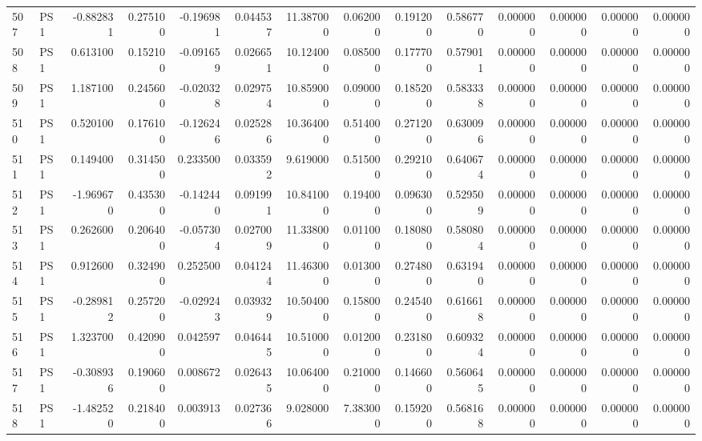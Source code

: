 \begin{tabular}{llrrrrrrrrrrrr}
507 &    PS1 & -0.882831 &      0.275100 & -0.196981 &    0.044537 &  11.387000 &      0.062000 &   0.191200 &  0.586770 &  0.000000 &   0.000000 &     0.000000 &     0.000000 \\
508 &    PS1 &  0.613100 &      0.152100 & -0.091659 &    0.026651 &  10.124000 &      0.085000 &   0.177700 &  0.579011 &  0.000000 &   0.000000 &     0.000000 &     0.000000 \\
509 &    PS1 &  1.187100 &      0.245600 & -0.020328 &    0.029754 &  10.859000 &      0.090000 &   0.185200 &  0.583338 &  0.000000 &   0.000000 &     0.000000 &     0.000000 \\
510 &    PS1 &  0.520100 &      0.176100 & -0.126246 &    0.025286 &  10.364000 &      0.514000 &   0.271200 &  0.630096 &  0.000000 &   0.000000 &     0.000000 &     0.000000 \\
511 &    PS1 &  0.149400 &      0.314500 &  0.233500 &    0.033592 &   9.619000 &      0.515000 &   0.292100 &  0.640674 &  0.000000 &   0.000000 &     0.000000 &     0.000000 \\
512 &    PS1 & -1.969670 &      0.435300 & -0.142440 &    0.091991 &  10.841000 &      0.194000 &   0.096300 &  0.529509 &  0.000000 &   0.000000 &     0.000000 &     0.000000 \\
513 &    PS1 &  0.262600 &      0.206400 & -0.057304 &    0.027009 &  11.338000 &      0.011000 &   0.180800 &  0.580804 &  0.000000 &   0.000000 &     0.000000 &     0.000000 \\
514 &    PS1 &  0.912600 &      0.324900 &  0.252500 &    0.041244 &  11.463000 &      0.013000 &   0.274800 &  0.631940 &  0.000000 &   0.000000 &     0.000000 &     0.000000 \\
515 &    PS1 & -0.289812 &      0.257200 & -0.029243 &    0.039329 &  10.504000 &      0.158000 &   0.245400 &  0.616618 &  0.000000 &   0.000000 &     0.000000 &     0.000000 \\
516 &    PS1 &  1.323700 &      0.420900 &  0.042597 &    0.046445 &  10.510000 &      0.012000 &   0.231800 &  0.609324 &  0.000000 &   0.000000 &     0.000000 &     0.000000 \\
517 &    PS1 & -0.308936 &      0.190600 &  0.008672 &    0.026435 &  10.064000 &      0.210000 &   0.146600 &  0.560645 &  0.000000 &   0.000000 &     0.000000 &     0.000000 \\
518 &    PS1 & -1.482520 &      0.218400 &  0.003913 &    0.027366 &   9.028000 &      7.383000 &   0.159200 &  0.568168 &  0.000000 &   0.000000 &     0.000000 &     0.000000 \\

\end{tabular}
